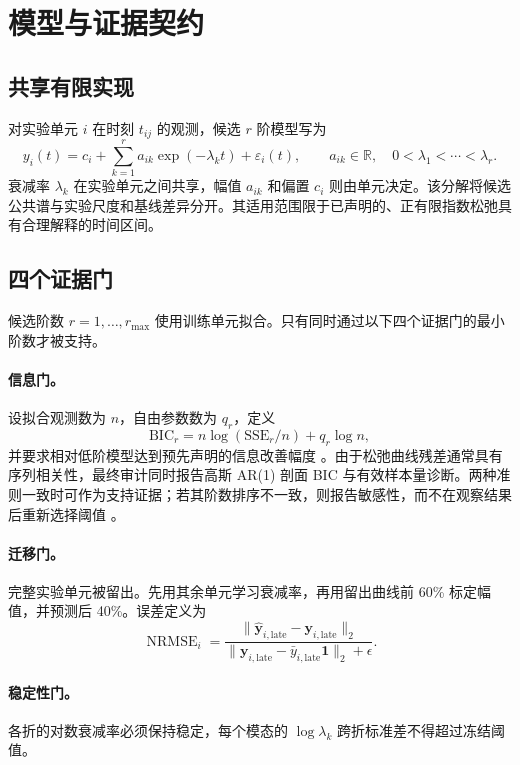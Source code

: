 \documentclass[UTF8,11pt]{ctexart}
\newcommand{\nrmse}{\operatorname{NRMSE}}
\begin{document}
\section{模型与证据契约}
\subsection{共享有限实现}
对实验单元 $i$ 在时刻 $t_{ij}$ 的观测，候选 $r$ 阶模型写为
\begin{equation}
y_i(t)=c_i+\sum_{k=1}^{r}a_{ik}\exp(-\lambda_k t)+\varepsilon_i(t),
\qquad a_{ik}\in\mathbb R,\quad 0<\lambda_1<\cdots<\lambda_r.
\label{eq:model-zh}
\end{equation}
衰减率 $\lambda_k$ 在实验单元之间共享，幅值 $a_{ik}$ 和偏置 $c_i$ 则由单元决定。该分解将候选公共谱与实验尺度和基线差异分开。其适用范围限于已声明的、正有限指数松弛具有合理解释的时间区间。

\subsection{四个证据门}
候选阶数 $r=1,\ldots,r_{\max}$ 使用训练单元拟合。只有同时通过以下四个证据门的最小阶数才被支持。

\paragraph{信息门。} 设拟合观测数为 $n$，自由参数数为 $q_r$，定义
\begin{equation}
\mathrm{BIC}_r=n\log(\mathrm{SSE}_r/n)+q_r\log n,
\end{equation}
并要求相对低阶模型达到预先声明的信息改善幅度 \cite{schwarz1978bic}。由于松弛曲线残差通常具有序列相关性，最终审计同时报告高斯 AR(1) 剖面 BIC 与有效样本量诊断。两种准则一致时可作为支持证据；若其阶数排序不一致，则报告敏感性，而不在观察结果后重新选择阈值 \cite{hurvich1989timeseries}。

\paragraph{迁移门。} 完整实验单元被留出。先用其余单元学习衰减率，再用留出曲线前 60\% 标定幅值，并预测后 40\%。误差定义为
\begin{equation}
\nrmse_i=\frac{\|\hat{\mathbf y}_{i,\mathrm{late}}-\mathbf y_{i,\mathrm{late}}\|_2}
{\|\mathbf y_{i,\mathrm{late}}-\bar y_{i,\mathrm{late}}\mathbf 1\|_2+\epsilon}.
\end{equation}

\paragraph{稳定性门。} 各折的对数衰减率必须保持稳定，每个模态的 $\log\lambda_k$ 跨折标准差不得超过冻结阈值。
\end{document}
